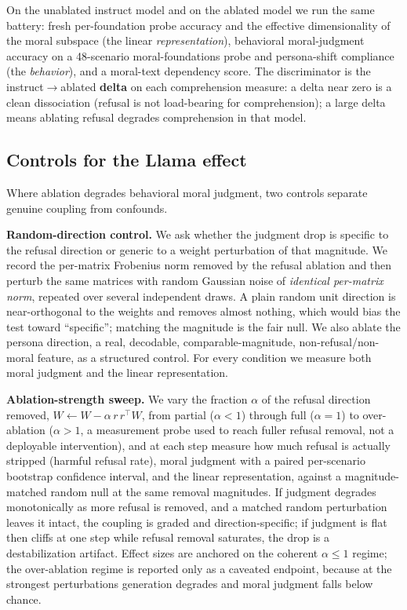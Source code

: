 On the unablated instruct model and on the ablated model we run the same battery:
fresh per-foundation probe accuracy and the effective dimensionality of the moral
subspace (the linear \emph{representation}), behavioral moral-judgment accuracy on a
48-scenario moral-foundations probe and persona-shift compliance (the \emph{behavior}),
and a moral-text dependency score. The discriminator is the instruct\(\to\)ablated
\textbf{delta} on each comprehension measure: a delta near zero is a clean dissociation
(refusal is not load-bearing for comprehension); a large delta means ablating
refusal degrades comprehension in that model.

\subsection{Controls for the Llama effect}\label{controls-for-the-llama-effect}

Where ablation degrades behavioral moral judgment, two controls separate genuine
coupling from confounds.

\textbf{Random-direction control.} We ask whether the judgment drop is specific to the
refusal direction or generic to a weight perturbation of that magnitude. We record
the per-matrix Frobenius norm removed by the refusal ablation and then perturb the
same matrices with random Gaussian noise of \emph{identical per-matrix norm}, repeated
over several independent draws. A plain random unit direction is near-orthogonal
to the weights and removes almost nothing, which would bias the test toward
``specific''; matching the magnitude is the fair null. We also ablate the persona
direction, a real, decodable, comparable-magnitude, non-refusal/non-moral feature,
as a structured control. For every condition we measure both moral judgment and
the linear representation.

\textbf{Ablation-strength sweep.} We vary the fraction \(\alpha\) of the refusal direction
removed, \(W \gets W - \alpha\, r\, r^{\top} W\), from partial (\(\alpha<1\)) through
full (\(\alpha=1\)) to over-ablation (\(\alpha>1\), a measurement probe used to reach
fuller refusal removal, not a deployable intervention), and at each step measure
how much refusal is actually stripped (harmful refusal rate), moral judgment with
a paired per-scenario bootstrap confidence interval, and the linear representation,
against a magnitude-matched random null at the same removal magnitudes. If judgment
degrades monotonically as more refusal is removed, and a matched random
perturbation leaves it intact, the coupling is graded and direction-specific; if
judgment is flat then cliffs at one step while refusal removal saturates, the drop
is a destabilization artifact. Effect sizes are anchored on the coherent
\(\alpha \le 1\) regime; the over-ablation regime is reported only as a caveated
endpoint, because at the strongest perturbations generation degrades and moral
judgment falls below chance.
